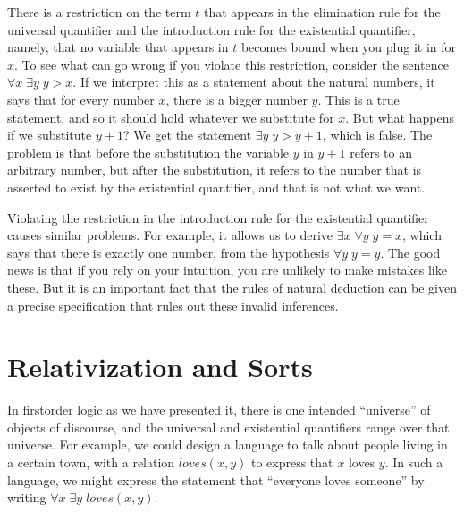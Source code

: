 \documentclass[letterpaper,10pt,english]{sphinxmanual}
\begin{document}
\sphinxAtStartPar
There is a restriction on the term \(t\) that appears in the elimination rule for the universal quantifier and the introduction rule for the existential quantifier, namely, that no variable that appears in \(t\) becomes bound when you plug it in for \(x\). To see what can go wrong if you violate this restriction, consider the sentence \(\forall x \; \exists y \; y > x\). If we interpret this as a statement about the natural numbers, it says that for every number \(x\), there is a bigger number \(y\). This is a true statement, and so it should hold whatever we substitute for \(x\). But what happens if we substitute \(y + 1\)? We get the statement \(\exists y \; y > y + 1\), which is false. The problem is that before the substitution the variable \(y\) in \(y + 1\) refers to an arbitrary number, but after the substitution, it refers to the number that is asserted to exist by the existential quantifier, and that is not what we want.

\sphinxAtStartPar
Violating the restriction in the introduction rule for the existential quantifier causes similar problems. For example, it allows us to derive \(\exists x \; \forall y \; y = x\), which says that there is exactly one number, from the hypothesis \(\forall y \; y = y\). The good news is that if you rely on your intuition, you are unlikely to make mistakes like these. But it is an important fact that the rules of natural deduction can be given a precise specification that rules out these invalid inferences.


\section{Relativization and Sorts}
\label{\detokenize{first_order_logic:relativization-and-sorts}}\label{\detokenize{first_order_logic:id3}}
\sphinxAtStartPar
In first\sphinxhyphen{}order logic as we have presented it, there is one intended “universe” of objects of discourse, and the universal and existential quantifiers range over that universe. For example, we could design a language to talk about people living in a certain town, with a relation \(\mathit{loves}(x, y)\) to express that \(x\) loves \(y\). In such a language, we might express the statement that “everyone loves someone” by writing \(\forall x \; \exists y \; \mathit{loves}(x, y)\).
\end{document}
